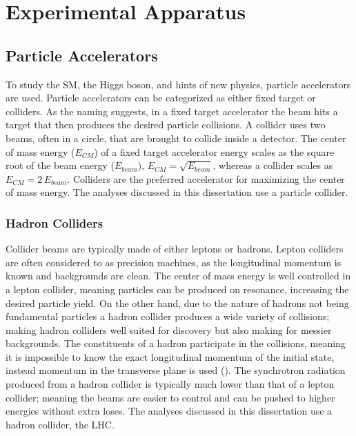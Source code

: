 \chapter{Experimental Apparatus}\label{chap:experiment}

\section{Particle Accelerators}\label{sec:accelerators}
	To study the \gls{SM}, the Higgs boson, and hints of new physics, particle accelerators are used. Particle accelerators can be categorized as either fixed target or colliders. As the naming suggests, in a fixed target accelerator the beam hits a target that then produces the desired particle collisions. A collider uses two beams, often in a circle, that are brought to collide inside a detector. The center of mass energy ($E_{CM}$) of a fixed target accelerator energy scales as the square root of the beam energy ($E_{beam}$), $E_{CM} = \sqrt{E_{beam}}$, whereas a collider scales as $E_{CM} = 2 \, E_{beam}$. Colliders are the preferred accelerator for maximizing the center of mass energy. The analyses discussed in this dissertation use a particle collider.

	\subsection{Hadron Colliders}\label{ssec:hadron-colliders}
		Collider beams are typically made of either leptons or hadrons. Lepton colliders are often considered to as precision machines, as the longitudinal momentum is known and backgrounds are clean. The center of mass energy is well controlled in a lepton collider, meaning particles can be produced on resonance, increasing the desired particle yield. On the other hand, due to the nature of hadrons not being fundamental particles a hadron collider produces a wide variety of collisions; making hadron colliders well suited for discovery but also making for messier backgrounds. The constituents of a hadron participate in the collisions, meaning it is impossible to know the exact longitudinal momentum of the initial state, instead momentum in the transverse plane is used (\pt). The synchrotron radiation produced from a hadron collider is typically much lower than that of a lepton collider; meaning the beams are easier to control and can be pushed to higher energies without extra loses. The analyses discussed in this dissertation use a hadron collider, the \acrlong{LHC}.

